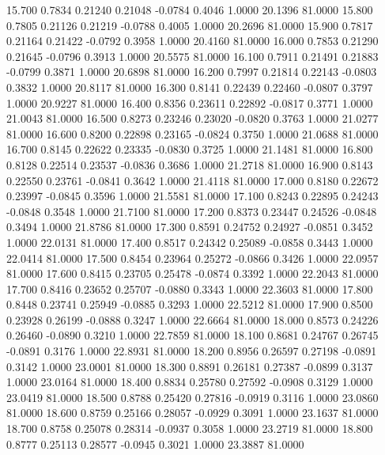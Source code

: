   15.700   0.7834   0.21240   0.21048  -0.0784   0.4046   1.0000  20.1396  81.0000
  15.800   0.7805   0.21126   0.21219  -0.0788   0.4005   1.0000  20.2696  81.0000
  15.900   0.7817   0.21164   0.21422  -0.0792   0.3958   1.0000  20.4160  81.0000
  16.000   0.7853   0.21290   0.21645  -0.0796   0.3913   1.0000  20.5575  81.0000
  16.100   0.7911   0.21491   0.21883  -0.0799   0.3871   1.0000  20.6898  81.0000
  16.200   0.7997   0.21814   0.22143  -0.0803   0.3832   1.0000  20.8117  81.0000
  16.300   0.8141   0.22439   0.22460  -0.0807   0.3797   1.0000  20.9227  81.0000
  16.400   0.8356   0.23611   0.22892  -0.0817   0.3771   1.0000  21.0043  81.0000
  16.500   0.8273   0.23246   0.23020  -0.0820   0.3763   1.0000  21.0277  81.0000
  16.600   0.8200   0.22898   0.23165  -0.0824   0.3750   1.0000  21.0688  81.0000
  16.700   0.8145   0.22622   0.23335  -0.0830   0.3725   1.0000  21.1481  81.0000
  16.800   0.8128   0.22514   0.23537  -0.0836   0.3686   1.0000  21.2718  81.0000
  16.900   0.8143   0.22550   0.23761  -0.0841   0.3642   1.0000  21.4118  81.0000
  17.000   0.8180   0.22672   0.23997  -0.0845   0.3596   1.0000  21.5581  81.0000
  17.100   0.8243   0.22895   0.24243  -0.0848   0.3548   1.0000  21.7100  81.0000
  17.200   0.8373   0.23447   0.24526  -0.0848   0.3494   1.0000  21.8786  81.0000
  17.300   0.8591   0.24752   0.24927  -0.0851   0.3452   1.0000  22.0131  81.0000
  17.400   0.8517   0.24342   0.25089  -0.0858   0.3443   1.0000  22.0414  81.0000
  17.500   0.8454   0.23964   0.25272  -0.0866   0.3426   1.0000  22.0957  81.0000
  17.600   0.8415   0.23705   0.25478  -0.0874   0.3392   1.0000  22.2043  81.0000
  17.700   0.8416   0.23652   0.25707  -0.0880   0.3343   1.0000  22.3603  81.0000
  17.800   0.8448   0.23741   0.25949  -0.0885   0.3293   1.0000  22.5212  81.0000
  17.900   0.8500   0.23928   0.26199  -0.0888   0.3247   1.0000  22.6664  81.0000
  18.000   0.8573   0.24226   0.26460  -0.0890   0.3210   1.0000  22.7859  81.0000
  18.100   0.8681   0.24767   0.26745  -0.0891   0.3176   1.0000  22.8931  81.0000
  18.200   0.8956   0.26597   0.27198  -0.0891   0.3142   1.0000  23.0001  81.0000
  18.300   0.8891   0.26181   0.27387  -0.0899   0.3137   1.0000  23.0164  81.0000
  18.400   0.8834   0.25780   0.27592  -0.0908   0.3129   1.0000  23.0419  81.0000
  18.500   0.8788   0.25420   0.27816  -0.0919   0.3116   1.0000  23.0860  81.0000
  18.600   0.8759   0.25166   0.28057  -0.0929   0.3091   1.0000  23.1637  81.0000
  18.700   0.8758   0.25078   0.28314  -0.0937   0.3058   1.0000  23.2719  81.0000
  18.800   0.8777   0.25113   0.28577  -0.0945   0.3021   1.0000  23.3887  81.0000
